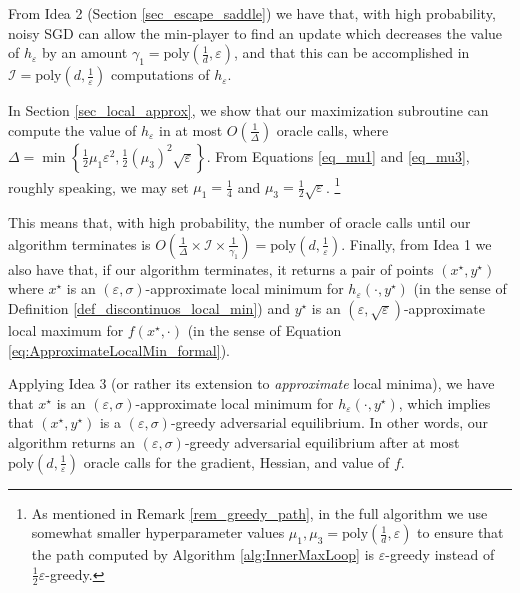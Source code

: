 \documentclass[11pt,letterpaper]{article}
\renewcommand{\epsilon}{\varepsilon}
\begin{document}
  From Idea 2 (Section \ref{sec_escape_saddle}) we have that, with high probability, noisy SGD can allow the min-player to find an update which decreases the value of $h_\epsilon$ by an amount  $\gamma_1=\mathrm{poly}\left(\frac{1}{d},  \epsilon\right)$, and that this can be accomplished in $\mathcal{I} =  \mathrm{poly}\left(d, \frac{1}{\epsilon}\right)$  computations of $h_\epsilon$.
 
 In Section \ref{sec_local_approx}, we show that our maximization subroutine can compute the value of $h_\epsilon$ in at most $O\left(\frac{1}{\Delta}\right)$ oracle calls, where $\Delta = \min\left\{\frac{1}{2} \mu_1 \epsilon^2, \frac{1}{2} (\mu_3)^2 \sqrt{\epsilon}\right\}$.
%
From Equations \eqref{eq_mu1} and \eqref{eq_mu3}, roughly speaking, we may set $\mu_1 = \frac{1}{4}$ and $\mu_3 =  \frac{1}{2} \sqrt{\epsilon}$. \footnote{As mentioned in Remark \ref{rem_greedy_path}, in the full algorithm we use somewhat smaller hyperparameter values $\mu_1, \mu_3 = \mathrm{poly}(\frac{1}{d}, \epsilon)$ to ensure that the path computed by Algorithm \ref{alg:InnerMaxLoop} is $\epsilon$-greedy instead of $\frac{1}{2} \epsilon$-greedy.}  %

This means that, with high probability, the number of oracle calls until our algorithm terminates is 
$
O\left(\frac{1}{\Delta} \times \mathcal{I} \times \frac{1}{\gamma_1}\right) = \mathrm{poly}\left(d, \frac{1}{\epsilon}\right).
$
%
Finally, from Idea 1 we also have that, if our algorithm terminates, it returns a pair of points $(x^\star, y^\star)$ where $x^\star$ is an $(\epsilon, \sigma)$-approximate local minimum for $h_\epsilon(\cdot, y^\star)$ (in the sense of Definition \ref{def_discontinuos_local_min}) and $y^\star$ is an $(\epsilon, \sqrt{ \epsilon})$-approximate local maximum for $f(x^\star,\cdot)$ (in the sense of Equation \eqref{eq:ApproximateLocalMin_formal}).

Applying Idea 3 (or rather its extension to {\em approximate} local minima), we have that  $x^\star$ is an $(\epsilon, \sigma)$-approximate local minimum for $h_\epsilon(\cdot, y^\star)$, which implies that $(x^\star, y^\star)$ is a $(\epsilon, \sigma)$-greedy adversarial equilibrium.
%
In other words, our algorithm returns an $(\epsilon, \sigma)$-greedy adversarial equilibrium after at most $ \mathrm{poly}\left(d, \frac{1}{\epsilon}\right)$ oracle calls for the gradient, Hessian, and value of $f$.
\end{document}
